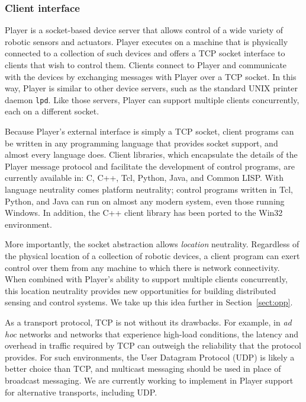 \documentclass[a4paper]{ICAR2003}
\begin{document}
\subsubsection{Client interface}
Player is a socket-based device server that allows control of a
wide variety of robotic sensors and actuators.  Player executes on a
machine that is physically connected to a collection of such devices
and offers a TCP socket interface to clients that wish to control them.
Clients connect to Player and communicate with the devices by exchanging
messages with Player over a TCP socket.  In this way, Player is similar to
other device servers, such as the standard UNIX printer daemon {\tt lpd}.
Like those servers, Player can support multiple clients concurrently,
each on a different socket.

Because Player's external interface is simply a TCP socket, client
programs can be written in any programming language that provides
socket support, and almost every language does.  Client libraries, which
encapsulate the details of the Player message protocol and facilitate the
development of control programs, are currently available in: C, C++, Tcl,
Python, Java, and Common LISP.  With language neutrality comes platform
neutrality; control programs written in Tcl, Python, and Java can run
on almost any modern system, even those running Windows.  In addition,
the C++ client library has been ported to the Win32 environment.

More importantly, the socket abstraction allows {\em location} neutrality.
Regardless of the physical location of a collection of robotic devices, a
client program can exert control over them from any machine to which there
is network connectivity.  When combined with Player's ability to support
multiple clients concurrently, this location neutrality provides new
opportunities for building distributed sensing and control systems.  We take
up this idea further in Section~\ref{sect:opp}.

As a transport protocol, TCP is not without its drawbacks.  For example,
in {\em ad hoc} networks and networks that experience high-load
conditions, the latency and overhead in traffic required by TCP
can outweigh the reliability that the protocol provides.  For such
environments, the User Datagram Protocol (UDP) \cite{RFC768} is likely
a better choice than TCP, and multicast messaging \cite{RFC1112} should
be used in place of broadcast messaging.  We are currently working to
implement in Player support for alternative transports, including UDP.
\end{document}
